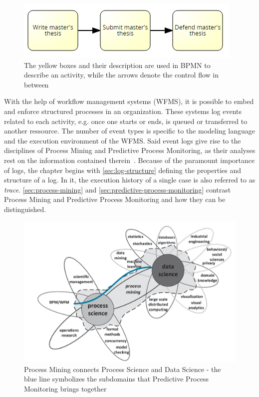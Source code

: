 \begin{figure}[!htb]
    \centering
    \includegraphics[width=.75\textwidth]{gfx/activity-introduction.png}
    \caption[Control flow in BPMN]{The yellow boxes and their description are used in BPMN to describe an activity, while the arrows denote the control flow in between}
    \label{fig:activity-introduction}
\end{figure}

With the help of workflow management systems (WFMS), it is possible to embed and enforce structured processes in an organization. These systems log events related to each activity, e.g. once one starts or ends, is queued or transferred to another ressource. The number of event types is specific to the modeling language and the execution environment of the WFMS. Said event logs give rise to the disciplines of Process Mining and Predictive Process Monitoring, as their analyses rest on the information contained therein~\cite{Aalst2016}. Because of the paramount importance of logs, the chapter begins with \autoref{sec:log-structure} defining the properties and structure of a log. In it, the execution history of a single case is also referred to as \textit{trace}. \autoref{sec:process-mining} and \autoref{sec:predictive-process-monitoring} contrast Process Mining and Predictive Process Monitoring and how they can be distinguished.

\begin{figure}[!htb]
    \centering
    \includegraphics[width=.8\textwidth]{gfx/process-data-science.png}
    \caption[Process Mining connects two disciplines]{Process Mining connects Process Science and Data Science \cite[p.18]{Aalst2016} - the blue line symbolizes the subdomains that Predictive Process Monitoring brings together}
    \label{fig:process-data-science}
\end{figure}


